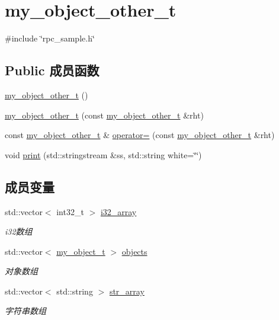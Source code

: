 \hypertarget{structrpc__sample_1_1my__object__other__t}{}\section{my\+\_\+object\+\_\+other\+\_\+t}
\label{structrpc__sample_1_1my__object__other__t}


{\ttfamily \#include \char`\"{}rpc\+\_\+sample.\+h\char`\"{}}

\subsection*{Public 成员函数}
\begin{DoxyCompactItemize}
\item 
\hyperlink{structrpc__sample_1_1my__object__other__t_af8d68c085da6a3ee0b53c76b2fa54864}{my\+\_\+object\+\_\+other\+\_\+t} ()
\item 
\hyperlink{structrpc__sample_1_1my__object__other__t_ab09ddde7d984e74a0f9d24fe4aa0c21e}{my\+\_\+object\+\_\+other\+\_\+t} (const \hyperlink{structrpc__sample_1_1my__object__other__t}{my\+\_\+object\+\_\+other\+\_\+t} \&rht)
\item 
const \hyperlink{structrpc__sample_1_1my__object__other__t}{my\+\_\+object\+\_\+other\+\_\+t} \& \hyperlink{structrpc__sample_1_1my__object__other__t_adadbf95f0789826090919d933ffd9c61}{operator=} (const \hyperlink{structrpc__sample_1_1my__object__other__t}{my\+\_\+object\+\_\+other\+\_\+t} \&rht)
\item 
void \hyperlink{structrpc__sample_1_1my__object__other__t_a2f718b12c2666105404ac2314de6e5e7}{print} (std\+::stringstream \&ss, std\+::string white=\char`\"{}\char`\"{})
\end{DoxyCompactItemize}
\subsection*{成员变量}
\begin{DoxyCompactItemize}
\item 
std\+::vector$<$ int32\+\_\+t $>$ \hyperlink{structrpc__sample_1_1my__object__other__t_aac16f58d6e1fac3e520e9a30b73bc312}{i32\+\_\+array}
\begin{DoxyCompactList}\small\item\em i32数组 \end{DoxyCompactList}\item 
std\+::vector$<$ \hyperlink{structrpc__sample_1_1my__object__t}{my\+\_\+object\+\_\+t} $>$ \hyperlink{structrpc__sample_1_1my__object__other__t_aefa08182691a0dffb9e0bdad6a50b421}{objects}
\begin{DoxyCompactList}\small\item\em 对象数组 \end{DoxyCompactList}\item 
std\+::vector$<$ std\+::string $>$ \hyperlink{structrpc__sample_1_1my__object__other__t_a5270a6498aa55551693b9a5e077dfbfc}{str\+\_\+array}
\begin{DoxyCompactList}\small\item\em 字符串数组 \end{DoxyCompactList}\end{DoxyCompactItemize}


